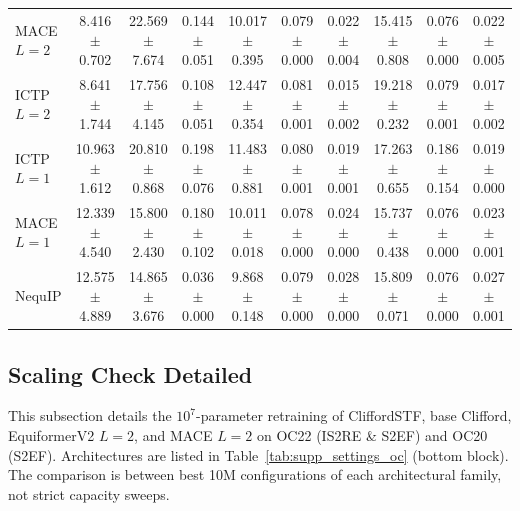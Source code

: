\begin{table}[h]
{\begin{tabular}{lccccccccc}
MACE $L{=}2$ & 8.416 $\pm$ 0.702 & 22.569 $\pm$ 7.674 & 0.144 $\pm$ 0.051 & 10.017 $\pm$ 0.395 & 0.079 $\pm$ 0.000 & 0.022 $\pm$ 0.004 & 15.415 $\pm$ 0.808 & 0.076 $\pm$ 0.000 & 0.022 $\pm$ 0.005 \\
ICTP $L{=}2$ & 8.641 $\pm$ 1.744 & 17.756 $\pm$ 4.145 & 0.108 $\pm$ 0.051 & 12.447 $\pm$ 0.354 & 0.081 $\pm$ 0.001 & 0.015 $\pm$ 0.002 & 19.218 $\pm$ 0.232 & 0.079 $\pm$ 0.001 & 0.017 $\pm$ 0.002 \\
ICTP $L{=}1$ & 10.963 $\pm$ 1.612 & 20.810 $\pm$ 0.868 & 0.198 $\pm$ 0.076 & 11.483 $\pm$ 0.881 & 0.080 $\pm$ 0.001 & 0.019 $\pm$ 0.001 & 17.263 $\pm$ 0.655 & 0.186 $\pm$ 0.154 & 0.019 $\pm$ 0.000 \\
MACE $L{=}1$ & 12.339 $\pm$ 4.540 & 15.800 $\pm$ 2.430 & 0.180 $\pm$ 0.102 & 10.011 $\pm$ 0.018 & 0.078 $\pm$ 0.000 & 0.024 $\pm$ 0.000 & 15.737 $\pm$ 0.438 & 0.076 $\pm$ 0.000 & 0.023 $\pm$ 0.001 \\
NequIP & 12.575 $\pm$ 4.889 & 14.865 $\pm$ 3.676 & 0.036 $\pm$ 0.000 & 9.868 $\pm$ 0.148 & 0.079 $\pm$ 0.000 & 0.028 $\pm$ 0.000 & 15.809 $\pm$ 0.071 & 0.076 $\pm$ 0.000 & 0.027 $\pm$ 0.001 \\
\bottomrule
\end{tabular}%
}
\end{table}

\subsection{Scaling Check Detailed}\label{supp:scaling_check}

This subsection details the $10^7$-parameter retraining of CliffordSTF, base Clifford, EquiformerV2 $L{=}2$, and MACE $L{=}2$ on OC22 (IS2RE \& S2EF) and OC20 (S2EF). Architectures are listed in Table~\ref{tab:supp_settings_oc} (bottom block). The comparison is between best 10M configurations of each architectural family, not strict capacity sweeps.

